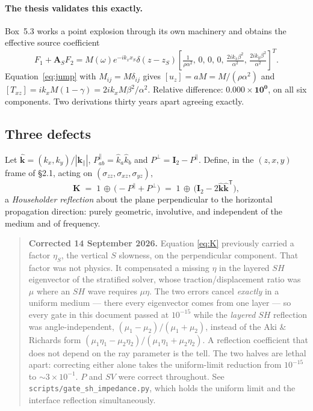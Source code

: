 \documentclass[11pt,a4paper]{article}
\newcommand{\bI}{\mathbf{I}}
\newcommand{\bK}{\mathbf{K}}
\begin{document}
\paragraph{The thesis validates this exactly.}  Box~5.3 works a point explosion
through its own machinery and obtains the effective source coefficient
\begin{equation}\label{eq:box53}
  F_1 + \mathbf{A}_{S} F_2 = M(\omega)e^{-ik_x x_S}\delta(z-z_S)
  \left[\tfrac{1}{\rho\alpha^{2}},\,0,\,0,\,0,\,
  \tfrac{2ik_x\beta^{2}}{\alpha^{2}},\,
  \tfrac{2ik_y\beta^{2}}{\alpha^{2}}\right]^{T}.
\end{equation}
Equation~\eqref{eq:jump} with $M_{ij}=M\delta_{ij}$ gives
$[u_z] = aM = M/(\rho\alpha^2)$ and
$[T_{xz}] = ik_xM(1-\gamma) = 2ik_xM\beta^2/\alpha^2$.  Relative difference:
$\mathbf{0.000\times10^{0}}$, on all six components.  Two derivations thirty
years apart agreeing exactly.

\subsection{Three defects}

Let $\hat{\mathbf{k}} = (k_x,k_y)/|\mathbf{k}_\parallel|$,
$P^{\parallel}_{ab} = \hat{k}_a\hat{k}_b$ and
$P^{\perp} = \bI_2 - P^{\parallel}$.  Define, in the $(z,x,y)$ frame of \S2.1,
acting on $(\sigma_{zz},\sigma_{xz},\sigma_{yz})$,
\begin{equation}\label{eq:K}
  \bK \;=\; 1 \,\oplus\, \bigl(-P^{\parallel} + P^{\perp}\bigr)
      \;=\; 1 \,\oplus\, \bigl(\bI_2 - 2\hat{\mathbf{k}}\hat{\mathbf{k}}^{\mathsf T}\bigr),
\end{equation}
a \emph{Householder reflection} about the plane perpendicular to the horizontal
propagation direction: purely geometric, involutive, and independent of the
medium and of frequency.

\begin{quote}\small
\textbf{Corrected 14 September 2026.}  Equation \eqref{eq:K} previously carried a
factor $\eta_S$, the vertical $S$ slowness, on the perpendicular component.  That
factor was not physics.  It compensated a missing $\eta$ in the layered $SH$
eigenvector of the stratified solver, whose traction/displacement ratio was $\mu$
where an $SH$ wave requires $\mu\eta$.  The two errors cancel \emph{exactly} in a
uniform medium --- there every eigenvector comes from one layer --- so every gate
in this document passed at $10^{-15}$ while the \emph{layered} $SH$ reflection was
angle-independent, $(\mu_1-\mu_2)/(\mu_1+\mu_2)$, instead of the Aki \& Richards
form $(\mu_1\eta_1-\mu_2\eta_2)/(\mu_1\eta_1+\mu_2\eta_2)$.  A reflection
coefficient that does not depend on the ray parameter is the tell.  The two
halves are lethal apart: correcting either alone takes the uniform-limit
reduction from $10^{-15}$ to $\sim\!3\times10^{-1}$.  $P$ and $SV$ were correct
throughout.  See \texttt{scripts/gate\_sh\_impedance.py}, which holds the uniform
limit and the interface reflection simultaneously.
\end{quote}
\end{document}
